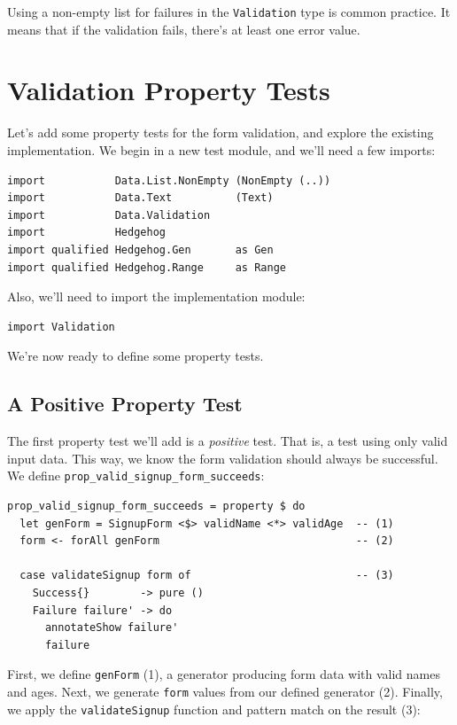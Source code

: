 Using a non-empty list for failures in the \texttt{Validation} type is
common practice. It means that if the validation fails, there's at least
one error value.

\section{Validation Property Tests}
\label{validation-property-tests}

Let's add some property tests for the form validation, and explore the
existing implementation. We begin in a new test module, and we'll need a
few imports:

\begin{verbatim}
import           Data.List.NonEmpty (NonEmpty (..))
import           Data.Text          (Text)
import           Data.Validation
import           Hedgehog
import qualified Hedgehog.Gen       as Gen
import qualified Hedgehog.Range     as Range
\end{verbatim}
Also, we'll need to import the implementation module:

\begin{verbatim}
import Validation
\end{verbatim}
We're now ready to define some property tests.

\subsection{A Positive Property
Test}
\label{a-positive-property-test}

The first property test we'll add is a \emph{positive} test. That is, a
test using only valid input data. This way, we know the form validation
should always be successful. We define
\texttt{prop\_valid\_signup\_form\_succeeds}:

\begin{verbatim}
prop_valid_signup_form_succeeds = property $ do
  let genForm = SignupForm <$> validName <*> validAge  -- (1)
  form <- forAll genForm                               -- (2)

  case validateSignup form of                          -- (3)
    Success{}        -> pure ()
    Failure failure' -> do
      annotateShow failure'
      failure
\end{verbatim}
First, we define \texttt{genForm} (1), a generator producing form data
with valid names and ages. Next, we generate \texttt{form} values from
our defined generator (2). Finally, we apply the \texttt{validateSignup}
function and pattern match on the result (3):

